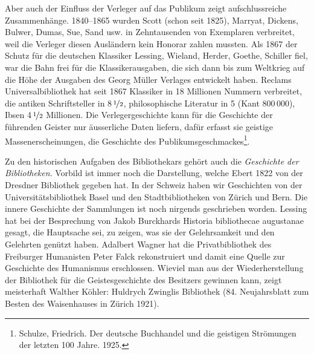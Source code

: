 \documentclass[a4paper,
fontsize=11pt,
oneside,
numbers=noperiodatend,
parskip=half-,
bibliography=totoc,
final
]{scrartcl}
\begin{document}
Aber auch der Einfluss der Verleger auf das Publikum zeigt
aufschlussreiche Zusammenhänge. 1840--1865 wurden Scott (schon seit
1825), Marryat, Dickens, Bulwer, Dumas, Sue, Sand usw. in Zehntausenden
von Exemplaren verbreitet, weil die Verleger diesen Ausländern kein
Honorar zahlen mussten. Als 1867 der Schutz für die deutschen Klassiker
Lessing, Wieland, Herder, Goethe, Schiller fiel, war die Bahn frei für
die Klassikerausgaben, die sich dann bis zum Weltkrieg auf die Höhe der
Ausgaben des Georg Müller Verlages entwickelt haben. Reclams
Universalbibliothek hat seit 1867 Klassiker in 18 Millionen Nummern
verbreitet, die antiken Schriftsteller in 8\,$\nicefrac{1}{2}$, philosophische Literatur
in 5 (Kant 800\,000), Ibsen 4\,$\nicefrac{1}{2}$ Millionen. Die Verlegergeschichte kann
für die Geschichte der führenden Geister nur äusserliche Daten liefern,
dafür erfasst sie geistige Massenerscheinungen, die Geschichte des
Publikumsgeschmackes\footnote{Schulze, Friedrich. Der deutsche
  Buchhandel und die geistigen Strömungen der letzten 100 Jahre. 1925.}.

Zu den historischen Aufgaben des Bibliothekars gehört auch die
\emph{Geschichte der Bibliotheken}. Vorbild ist immer noch die
Darstellung, welche Ebert 1822 von der Dresdner Bibliothek gegeben hat.
In der Schweiz haben wir Geschichten von der Universitätsbibliothek
Basel und den Stadtbibliotheken von Zürich und Bern. Die innere
Geschichte der Sammlungen ist noch nirgends geschrieben worden. Lessing
hat bei der Besprechung von Jakob Burckhards Historia bibliothecae
augustanae gesagt, die Hauptsache sei, zu zeigen, was sie der
Gelehrsamkeit und den Gelehrten genützt haben. Adalbert Wagner hat die
Privatbibliothek des Freiburger Humanisten Peter Falck rekonstruiert und
damit eine Quelle zur Geschichte des Humanismus erschlossen. Wieviel man
aus der Wiederherstellung der Bibliothek für die Geistesgeschichte des
Besitzers gewinnen kann, zeigt meisterhaft Walther Köhler: Huldrych
Zwinglis Bibliothek (84. Neujahrsblatt zum Besten des Waisenhauses in
Zürich 1921).
\end{document}

